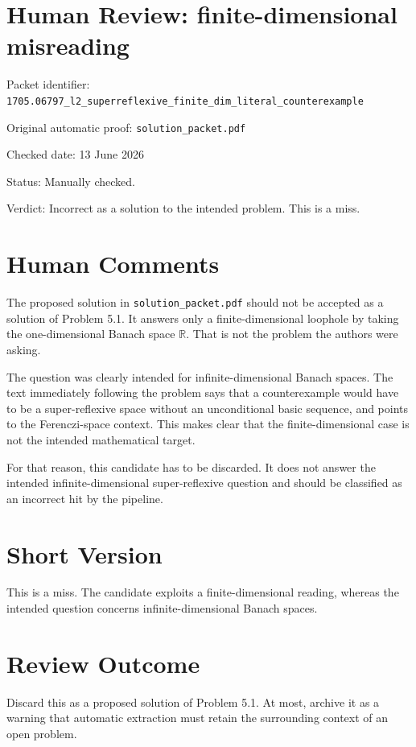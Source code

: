 \documentclass[11pt]{article}
\begin{document}
\section*{Human Review: finite-dimensional misreading}

\noindent Packet identifier:
\texttt{1705.06797\_l2\_superreflexive\_finite\_dim\_literal\_counterexample}

\noindent Original automatic proof: \texttt{solution\_packet.pdf}

\noindent Checked date: 13 June 2026

\noindent Status: Manually checked.

\noindent Verdict: Incorrect as a solution to the intended problem.  This is a miss.

\section*{Human Comments}

The proposed solution in \texttt{solution\_packet.pdf} should not be accepted as
a solution of Problem 5.1.  It answers only a finite-dimensional loophole by
taking the one-dimensional Banach space \(\mathbb R\).  That is not the problem
the authors were asking.

The question was clearly intended for infinite-dimensional Banach spaces.  The
text immediately following the problem says that a counterexample would have
to be a super-reflexive space without an unconditional basic sequence, and
points to the Ferenczi-space context.  This makes clear that the
finite-dimensional case is not the intended mathematical target.

For that reason, this candidate has to be discarded.  It does not answer the
intended infinite-dimensional super-reflexive question and should be classified
as an incorrect hit by the pipeline.

\section*{Short Version}

This is a miss.  The candidate exploits a finite-dimensional reading, whereas
the intended question concerns infinite-dimensional Banach spaces.

\section*{Review Outcome}

Discard this as a proposed solution of Problem 5.1.  At most, archive it as a
warning that automatic extraction must retain the surrounding context of an
open problem.
\end{document}
